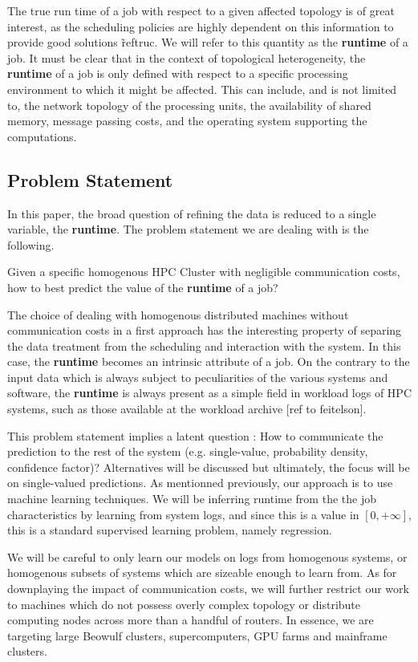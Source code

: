 \documentclass{article}
\begin{document}
The true run time of a job with respect to a given affected topology is of great interest, as the scheduling policies are highly dependent on this information to provide good solutions \~ref{truc}. We will refer to this quantity as the \textbf{runtime} of a job.
It must be clear that in the context of topological heterogeneity, the \textbf{runtime} of a job is only defined with respect to a specific processing environment to which it might be affected.
This can include, and is not limited to, the network topology of the processing units, the availability of shared memory, message passing costs, and the operating system supporting the computations.

\subsection{Problem Statement}
In this paper, the broad question of refining the data is reduced to a single variable, the \textbf{runtime}. The problem statement we are dealing with is the following.

Given a specific homogenous HPC Cluster with negligible communication costs, how to best predict the value of the \textbf{runtime} of a job? 

The choice of dealing with homogenous distributed machines without communication costs in a first approach has the interesting property of separing the data treatment from the scheduling and interaction with the system.
In this case, the \textbf{runtime} becomes an intrinsic attribute of a job. 
On the contrary to the input data which is always subject to peculiarities of the various systems and software, the \textbf{runtime} is always present as a simple field in workload logs of HPC systems, such as those available at the workload archive [ref to feitelson].

This problem statement implies a latent question : How to communicate the prediction to the rest of the system (e.g. single-value, probability density, confidence factor)? Alternatives will be discussed but ultimately, the focus will be on single-valued predictions.
As mentionned previously, our approach is to use machine learning techniques. We will be inferring runtime from the the job characteristics by learning from system logs, and since this is a value in $[0,+\infty ]$, this is a standard supervised learning problem, namely regression.

We will be careful to only learn our models on logs from homogenous systems, or homogenous subsets of systems which are sizeable enough to learn from.
As for downplaying the impact of communication costs, we will further restrict our work to machines which do not possess overly complex topology or distribute computing nodes across more than a handful of routers.
In essence, we are targeting large Beowulf clusters, supercomputers, GPU farms and mainframe clusters.
\end{document}
